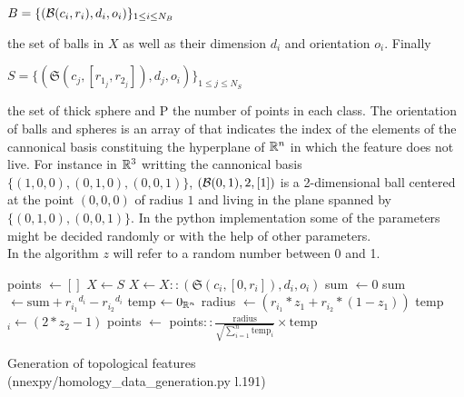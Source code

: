 \documentclass[12pt, a4paper]{article}
\begin{document}
\begin{center}
 $B = \{(\mathcal{B}(c_i, r_i), d_i, o_i)\}_{1 \le i \le N_B}$ 
\end{center}

 the set of balls in $X$ as well as their dimension $d_i$ and orientation $o_i$. Finally

 \begin{center}
  $S = \{(\mathfrak{S}(c_j, [r_{1_j}, r_{2_j}]), d_j, o_i)\}_{1 \le j \le N_S}$ 
 \end{center}

the set of thick sphere and P the number of points in each class. The orientation of balls and spheres is an array of that indicates the index of the elements of the cannonical basis constituing the hyperplane of $\mathbb{R}^n$ in which the feature does not live. For instance in $\mathbb{R}^3$ writting the cannonical basis $\{(1,0,0), (0,1,0), (0,0,1)\}$, $(\mathcal{B}(0,1),2,[1])$ is a 2-dimensional ball centered at the point $(0,0,0)$ of radius $1$ and living in the plane spanned by $\{(0,1,0),(0,0,1)\}$. In the python implementation some of the parameters might be decided randomly or with the help of other parameters.\\

In the algorithm $z$ will refer to a random number between 0 and 1.

\begin{algorithm}[H]
  \begin{algorithmic}[1]
    \STATE points $\gets []$
    \STATE $X \gets S$
    \STATE $X \gets X::(\mathfrak{S}(c_i, [0, r_i]), d_i, o_i)$
    \ENDFOR
    \STATE sum $\gets 0$
    \STATE sum $\gets \text{sum}+ {r_{i_1}}^{d_i} - {r_{i_2}}^{d_i}$
    \ENDFOR
    \STATE temp $\gets 0_{\mathbb{R}^n}$
    \STATE radius $ \gets (r_{i_1} * z_1 + r_{i_2} * (1 - z_1))$
    \STATE temp$_i \gets (2*z_2 - 1)$
    \ENDIF
    \ENDFOR
    \STATE points $\gets$ points$::\frac{\text{radius}}{\sqrt{\sum\limits_{i=1}^n \text{temp}_i}} \times \text{temp}$
    \ENDFOR
    \ENDFOR
    
  \end{algorithmic}
  \caption{Generation of topological features \\ ({\selectfont nnexpy/homology\_data\_generation.py l.191})}
  \label{alg:topo_gen}
\end{algorithm}
\end{document}
